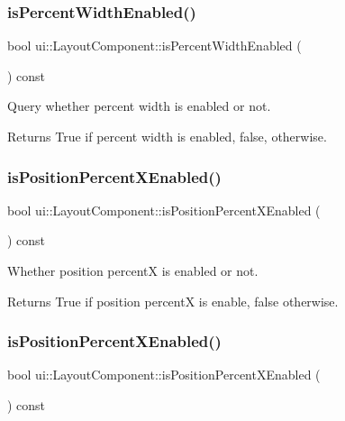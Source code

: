 \subsubsection{\texorpdfstring{is\+Percent\+Width\+Enabled()}{isPercentWidthEnabled()}\hspace{0.1cm}{\footnotesize\ttfamily [2/2]}}
{\footnotesize\ttfamily bool ui\+::\+Layout\+Component\+::is\+Percent\+Width\+Enabled (\begin{DoxyParamCaption}{ }\end{DoxyParamCaption}) const}

Query whether percent width is enabled or not. \begin{DoxyReturn}{Returns}
True if percent width is enabled, false, otherwise. 
\end{DoxyReturn}
\mbox{\label{classui_1_1LayoutComponent_a6918d9366c8e524788cbe58f786d8075}} 
\subsubsection{\texorpdfstring{is\+Position\+Percent\+X\+Enabled()}{isPositionPercentXEnabled()}\hspace{0.1cm}{\footnotesize\ttfamily [1/2]}}
{\footnotesize\ttfamily bool ui\+::\+Layout\+Component\+::is\+Position\+Percent\+X\+Enabled (\begin{DoxyParamCaption}{ }\end{DoxyParamCaption}) const}

Whether position percentX is enabled or not. \begin{DoxyReturn}{Returns}
True if position percentX is enable, false otherwise. 
\end{DoxyReturn}
\mbox{\label{classui_1_1LayoutComponent_a6918d9366c8e524788cbe58f786d8075}} 
\subsubsection{\texorpdfstring{is\+Position\+Percent\+X\+Enabled()}{isPositionPercentXEnabled()}\hspace{0.1cm}{\footnotesize\ttfamily [2/2]}}
{\footnotesize\ttfamily bool ui\+::\+Layout\+Component\+::is\+Position\+Percent\+X\+Enabled (\begin{DoxyParamCaption}{ }\end{DoxyParamCaption}) const}

